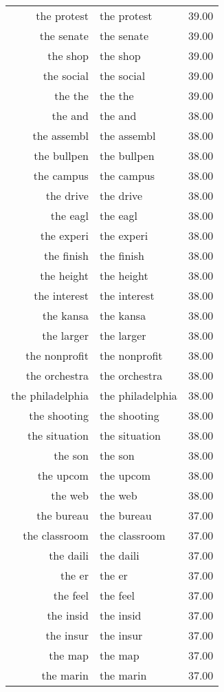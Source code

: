 \begin{table}[ht]
\begin{tabular}{rlr}
  the protest & the protest & 39.00 \\ 
  the senate & the senate & 39.00 \\ 
  the shop & the shop & 39.00 \\ 
  the social & the social & 39.00 \\ 
  the the & the the & 39.00 \\ 
  the and & the and & 38.00 \\ 
  the assembl & the assembl & 38.00 \\ 
  the bullpen & the bullpen & 38.00 \\ 
  the campus & the campus & 38.00 \\ 
  the drive & the drive & 38.00 \\ 
  the eagl & the eagl & 38.00 \\ 
  the experi & the experi & 38.00 \\ 
  the finish & the finish & 38.00 \\ 
  the height & the height & 38.00 \\ 
  the interest & the interest & 38.00 \\ 
  the kansa & the kansa & 38.00 \\ 
  the larger & the larger & 38.00 \\ 
  the nonprofit & the nonprofit & 38.00 \\ 
  the orchestra & the orchestra & 38.00 \\ 
  the philadelphia & the philadelphia & 38.00 \\ 
  the shooting & the shooting & 38.00 \\ 
  the situation & the situation & 38.00 \\ 
  the son & the son & 38.00 \\ 
  the upcom & the upcom & 38.00 \\ 
  the web & the web & 38.00 \\ 
  the bureau & the bureau & 37.00 \\ 
  the classroom & the classroom & 37.00 \\ 
  the daili & the daili & 37.00 \\ 
  the er & the er & 37.00 \\ 
  the feel & the feel & 37.00 \\ 
  the insid & the insid & 37.00 \\ 
  the insur & the insur & 37.00 \\ 
  the map & the map & 37.00 \\ 
  the marin & the marin & 37.00 \\ 

\end{tabular}
\end{table}
